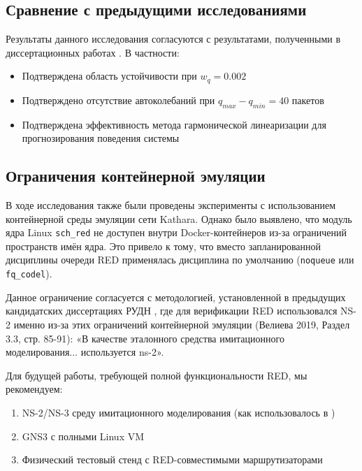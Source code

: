 \documentclass[10pt, conference, twocolumn, a4paper]{article}
\begin{document}
\subsection{Сравнение с предыдущими исследованиями}
Результаты данного исследования согласуются с результатами, полученными в диссертационных работах \cite{korolkova2010phd, velieva2019phd}. В частности:
\begin{itemize}
    \item Подтверждена область устойчивости при $w_q = 0.002$
    \item Подтверждено отсутствие автоколебаний при $q_{max} - q_{min} = 40$ пакетов
    \item Подтверждена эффективность метода гармонической линеаризации для прогнозирования поведения системы
\end{itemize}

\subsection{Ограничения контейнерной эмуляции}
В ходе исследования также были проведены эксперименты с использованием контейнерной среды эмуляции сети Kathara. Однако было выявлено, что модуль ядра Linux \texttt{sch\_red} не доступен внутри Docker-контейнеров из-за ограничений пространств имён ядра. Это привело к тому, что вместо запланированной дисциплины очереди RED применялась дисциплина по умолчанию (\texttt{noqueue} или \texttt{fq\_codel}).

Данное ограничение согласуется с методологией, установленной в предыдущих кандидатских диссертациях РУДН \cite{korolkova2010phd, velieva2019phd}, где для верификации RED использовался NS-2 именно из-за этих ограничений контейнерной эмуляции (Велиева 2019, Раздел 3.3, стр. 85-91): «В качестве эталонного средства имитационного моделирования... используется ns-2».

Для будущей работы, требующей полной функциональности RED, мы рекомендуем:
\begin{enumerate}
    \item NS-2/NS-3 среду имитационного моделирования (как использовалось в \cite{velieva2019phd})
    \item GNS3 с полными Linux VM
    \item Физический тестовый стенд с RED-совместимыми маршрутизаторами
\end{enumerate}
\end{document}
